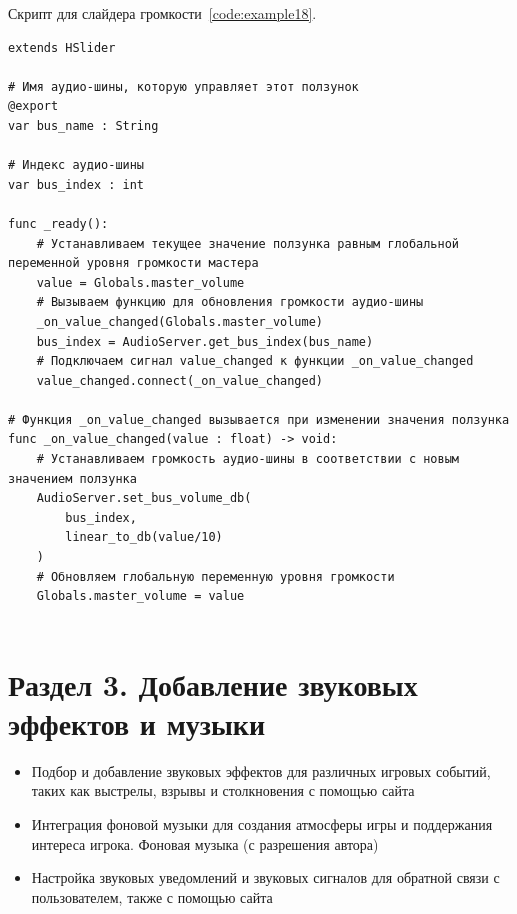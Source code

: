 \label{{subsec:ch02/sec01/sub19}Подраздел 19. Скрипт для слайдера громкости}
Скрипт для слайдера громкости~\ref{code:example18}.
\begin{code}
\vspace{-\baselineskip}\begin{verbatim}
extends HSlider

# Имя аудио-шины, которую управляет этот ползунок
@export
var bus_name : String

# Индекс аудио-шины
var bus_index : int

func _ready():
    # Устанавливаем текущее значение ползунка равным глобальной переменной уровня громкости мастера
    value = Globals.master_volume
    # Вызываем функцию для обновления громкости аудио-шины
    _on_value_changed(Globals.master_volume)
    bus_index = AudioServer.get_bus_index(bus_name)
    # Подключаем сигнал value_changed к функции _on_value_changed
    value_changed.connect(_on_value_changed)

# Функция _on_value_changed вызывается при изменении значения ползунка
func _on_value_changed(value : float) -> void:
    # Устанавливаем громкость аудио-шины в соответствии с новым значением ползунка
    AudioServer.set_bus_volume_db(
        bus_index,
        linear_to_db(value/10)
    )
    # Обновляем глобальную переменную уровня громкости
    Globals.master_volume = value


\end{verbatim}
\end{code}

\section{\label{sec:ch02/sec03}Раздел 3. Добавление звуковых эффектов и музыки}

\begin{itemize}
    \item Подбор и добавление звуковых эффектов для различных игровых событий, таких как выстрелы, взрывы и столкновения с помощью сайта \cite{https://sfxr.me/}
    \item Интеграция фоновой музыки для создания атмосферы игры и поддержания интереса игрока. Фоновая музыка (с разрешения автора) \cite{https://www.youtube.com/watch?v=-35AC-FPoAA}
    \item Настройка звуковых уведомлений и звуковых сигналов для обратной связи с пользователем, также с помощью сайта \cite{https://sfxr.me/}
\end{itemize}
 